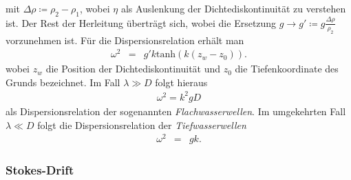 \documentclass{book}
\renewcommand{\tanh}{\text{tanh}}
\begin{document}
%
mit $\Delta\rho \coloneqq \rho_2 - \rho_1$, wobei $\eta$ als Auslenkung der Dichtediskontinuität zu verstehen ist. Der Rest der Herleitung überträgt sich, wobei die Ersetzung $g \to g' \coloneqq g\frac{\Delta\rho}{\rho_2}$ vorzunehmen ist. Für die Dispersionsrelation erhält man
%
\begin{eqnarray}
\omega^2 & = & g'k\tanh\left(k\left(z_w - z_0\right)\right).
\end{eqnarray}
%
wobei $z_w$ die Position der Dichtediskontinuität und $z_0$ die Tiefenkoordinate des Grunds bezeichnet.
Im Fall $\lambda \gg D$ folgt hieraus
%
\begin{eqnarray}
\omega^2 = k^2gD
\end{eqnarray}
%
als Dispersionsrelation der sogenannten \textit{Flachwasserwellen}. Im umgekehrten Fall $\lambda \ll D$ folgt die Dispersionsrelation der \textit{Tiefwasserwellen}
%
\begin{eqnarray}
\omega^2 & = & gk.
\end{eqnarray}

\subsubsection{Stokes-Drift}
\label{sec:stokes-drift}
\end{document}
